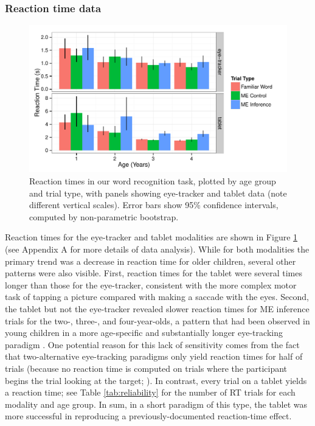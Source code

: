 \documentclass[man,noapacite]{apa2}
\begin{document}
\subsubsection{Reaction time data}

\begin{figure}[t] 
  \begin{center} 
    \includegraphics[width=5in]{figures/rt.pdf} 
    \caption{\label{fig:rt} Reaction times in our word recognition task, plotted by age group and trial type, with panels showing eye-tracker and tablet data (note different vertical scales). Error bars show 95\% confidence intervals, computed by non-parametric bootstrap.}
  \end{center} 
\end{figure}

Reaction times for the eye-tracker and tablet modalities are shown in Figure \ref{fig:rt} (see Appendix A for more details of data analysis). While for both modalities the primary trend was a decrease in reaction time for older children, several other patterns were also visible. First, reaction times for the tablet were several times longer than those for the eye-tracker, consistent with the more complex motor task of tapping a picture compared with making a saccade with the eyes. Second, the tablet but not the eye-tracker revealed slower reaction times for ME inference trials for the two-, three-, and four-year-olds, a pattern that had been observed in young children in a more age-specific and substantially longer eye-tracking paradigm \cite{bion2013}. One potential reason for this lack of sensitivity comes from the fact that two-alternative eye-tracking paradigms only yield reaction times for half of trials (because no reaction time is computed on trials where the participant begins the trial looking at the target; ). In contrast, every trial on a tablet yields a reaction time; see Table \ref{tab:reliability} for the number of RT trials for each modality and age group. In sum, in a short paradigm of this type, the tablet was more successful in reproducing a previously-documented reaction-time effect.
\end{document}
